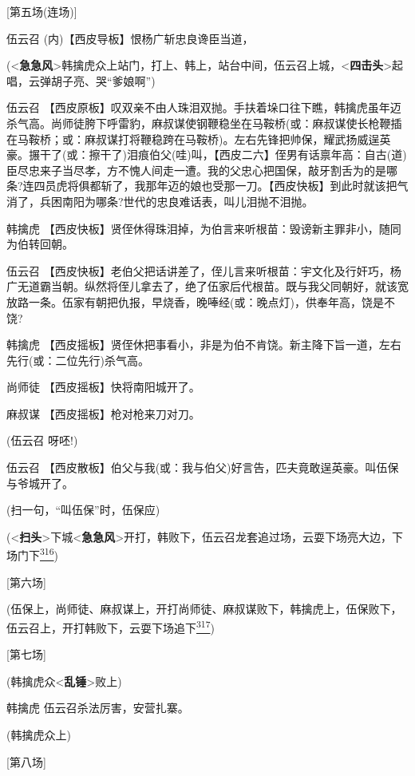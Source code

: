 {[}第五场(连场){]}

伍云召 (内)【西皮导板】恨杨广斩忠良谗臣当道，

(\textless{}\textbf{急急风}\textgreater{}韩擒虎众上站门，打上、韩上，站台中间，伍云召上城，\textless{}\textbf{四击头}\textgreater{}起唱，云弹胡子亮、哭``爹娘啊'')

伍云召
【西皮原板】叹双亲不由人珠泪双抛。手扶着垛口往下瞧，韩擒虎虽年迈杀气高。尚师徒胯下呼雷豹，麻叔谋使钢鞭稳坐在马鞍桥(或：麻叔谋使长枪鞭插在马鞍桥；或：麻叔谋打将鞭稳跨在马鞍桥)。左右先锋把帅保，耀武扬威逞英豪。搌干了(或：擦干了)泪痕伯父(哇)叫，【西皮二六】侄男有话禀年高：自古(道)臣尽忠来子当尽孝，方不愧人间走一遭。我的父忠心把国保，敲牙割舌为的是哪条?连四员虎将俱都斩了，我那年迈的娘也受那一刀。【西皮快板】到此时就该把气消了，兵困南阳为哪条?世代的忠良难话表，叫儿泪抛不泪抛。

韩擒虎
【西皮快板】贤侄休得珠泪掉，为伯言来听根苗：毁谤新主罪非小，随同为伯转回朝。

伍云召
【西皮快板】老伯父把话讲差了，侄儿言来听根苗：宇文化及行奸巧，杨广无道霸当朝。纵然将侄儿拿去了，绝了伍家后代根苗。既与我父同朝好，就该宽放路一条。伍家有朝把仇报，早烧香，晚唪经(或：晚点灯)，供奉年高，饶是不饶?

韩擒虎
【西皮摇板】贤侄休把事看小，非是为伯不肯饶。新主降下旨一道，左右先行(或：二位先行)杀气高。

尚师徒 【西皮摇板】快将南阳城开了。

麻叔谋 【西皮摇板】枪对枪来刀对刀。

(伍云召 呀呸!)

伍云召
【西皮散板】伯父与我(或：我与伯父)好言告，匹夫竟敢逞英豪。叫伍保与爷城开了。

(扫一句，``叫伍保''时，伍保应)

(\textless{}\textbf{扫头}\textgreater{}下城\textless{}\textbf{急急风}\textgreater{}开打，韩败下，伍云召龙套追过场，云耍下场亮大边，下场门下\protect\hyperlink{fn316}{\textsuperscript{316}})

{[}第六场{]}

(伍保上，尚师徒、麻叔谋上，开打尚师徒、麻叔谋败下，韩擒虎上，伍保败下，伍云召上，开打韩败下，云耍下场追下\protect\hyperlink{fn317}{\textsuperscript{317}})

{[}第七场{]}

(韩擒虎众\textless{}\textbf{乱锤}\textgreater{}败上)

韩擒虎 伍云召杀法厉害，安营扎寨。

(韩擒虎众上)

{[}第八场{]}


